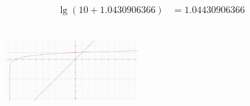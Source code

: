 {\begin{minipage}[b]{0.35\textwidth}
{{\begin{displaymath}
\begin{aligned}
\\\lg(10+1.0430906366)&=1.04430906366
		\end{aligned}
	\end{displaymath}}}
\end{minipage}
\hfill
\begin{minipage}[b]{0.62\textwidth}
\begin{figure}[h!]
	\vspace{-0.21in}
\centering
\includegraphics[height=1.3in,width=2.0in,viewport=0 0 2500 1600,clip]{Figures/solve_lg10.png}
\label{solution-log_10}
\end{figure}
\end{minipage}
}

